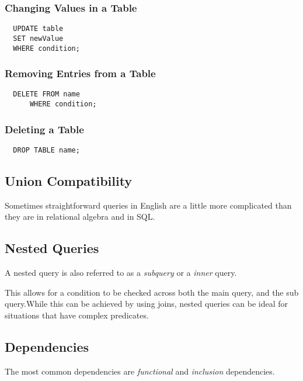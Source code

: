 \documentclass{article}
\begin{document}
\subsubsection{Changing Values in a Table}

\begin{lstlisting}
  UPDATE table
  SET newValue
  WHERE condition;
\end{lstlisting}

\subsubsection{Removing Entries from a Table}

\begin{lstlisting}
  DELETE FROM name
      WHERE condition;
\end{lstlisting}

\subsubsection{Deleting a Table}

\begin{lstlisting}
  DROP TABLE name;
\end{lstlisting}



\subsection{Union Compatibility}

Sometimes straightforward queries in English are a little more complicated than they are in relational algebra and in SQL. 

\subsection{Nested Queries}

A nested query is also referred to as a \textit{subquery} or a \textit{inner} query.

This allows for a condition to be checked across both the main query, and the sub query.While this can be achieved by using joins, nested queries can be ideal for situations that have complex predicates.

\subsection{Dependencies}

The most common dependencies are \textit{functional} and \textit{inclusion} dependencies.
\end{document}
